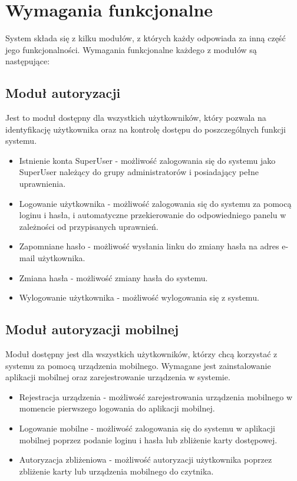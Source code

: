 \section{Wymagania funkcjonalne}

System składa się z kilku modułów, z których każdy odpowiada za inną część jego funkcjonalności. Wymagania funkcjonalne każdego z modułów są następujące:

\subsection{Moduł autoryzacji}

Jest to moduł dostępny dla wszystkich użytkowników, który pozwala na identyfikację użytkownika oraz na kontrolę dostępu do poszczególnych funkcji systemu.

\begin{itemize}
    \item {Istnienie konta SuperUser} - możliwość zalogowania się do systemu jako SuperUser należący do grupy administratorów i posiadający pełne uprawnienia.
    \item {Logowanie użytkownika} - możliwość zalogowania się do systemu za pomocą loginu i hasła, i automatyczne przekierowanie do odpowiedniego panelu w zależności od przypisanych uprawnień.
    \item {Zapomniane hasło} - możliwość wysłania linku do zmiany hasła na adres e-mail użytkownika.
    \item {Zmiana hasła} - możliwość zmiany hasła do systemu.
    \item {Wylogowanie użytkownika} - możliwość wylogowania się z systemu.
\end{itemize}

\subsection{Moduł autoryzacji mobilnej}

Moduł dostępny jest dla wszystkich użytkowników, którzy chcą korzystać z systemu za pomocą urządzenia mobilnego. Wymagane jest zainstalowanie aplikacji mobilnej oraz zarejestrowanie urządzenia w systemie.

\begin{itemize}
    \item {Rejestracja urządzenia} - możliwość zarejestrowania urządzenia mobilnego w momencie pierwszego logowania do aplikacji mobilnej.
    \item {Logowanie mobilne} - możliwość zalogowania się do systemu w aplikacji mobilnej poprzez podanie loginu i hasła lub zbliżenie karty dostępowej.
    \item {Autoryzacja zbliżeniowa} - możliwość autoryzacji użytkownika poprzez zbliżenie karty lub urządzenia mobilnego do czytnika.
\end{itemize}

